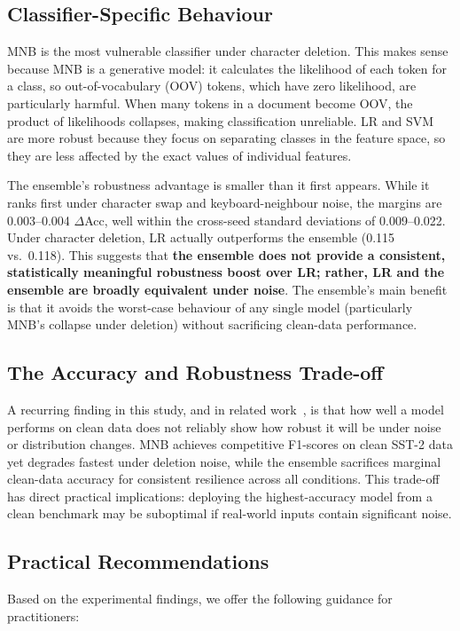 \documentclass[sigconf]{acmart}
\begin{document}
\subsection{Classifier-Specific Behaviour}
MNB is the most vulnerable classifier under character deletion. This makes
sense because MNB is a generative model: it calculates the likelihood of each
token for a class, so out-of-vocabulary (OOV) tokens, which have zero
likelihood, are particularly harmful. When many tokens in a document become
OOV, the product of likelihoods collapses, making classification unreliable.
LR and SVM are more robust because they focus on separating classes in the
feature space, so they are less affected by the exact values of individual
features.

The ensemble's robustness advantage is smaller than it first appears. While it
ranks first under character swap and keyboard-neighbour noise, the margins are
0.003--0.004 $\Delta$Acc, well within the cross-seed standard deviations of
0.009--0.022. Under character deletion, LR actually outperforms the ensemble
(0.115 vs.\ 0.118). This suggests that \textbf{the ensemble does not provide a
consistent, statistically meaningful robustness boost over LR; rather, LR and
the ensemble are broadly equivalent under noise}. The ensemble's main benefit
is that it avoids the worst-case behaviour of any single model (particularly
MNB's collapse under deletion) without sacrificing clean-data performance.

\subsection{The Accuracy and Robustness Trade-off}
A recurring finding in this study, and in related work~\cite{tumula2024}, is
that how well a model performs on clean data does not reliably show how robust
it will be under noise or distribution changes. MNB achieves competitive
F1-scores on clean SST-2 data yet degrades fastest under deletion noise, while
the ensemble sacrifices marginal clean-data accuracy for consistent resilience
across all conditions. This trade-off has direct practical implications:
deploying the highest-accuracy model from a clean benchmark may be suboptimal
if real-world inputs contain significant noise.

\subsection{Practical Recommendations}
Based on the experimental findings, we offer the following guidance for
practitioners:
\end{document}
